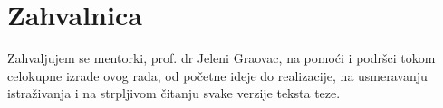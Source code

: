 \chapter*{Zahvalnica}
\thispagestyle{empty}
Zahvaljujem se mentorki, prof. dr Jeleni Graovac, na pomoći i podršci tokom celokupne izrade ovog rada,
od početne ideje do realizacije, na usmeravanju istraživanja i na strpljivom čitanju svake verzije teksta teze.
